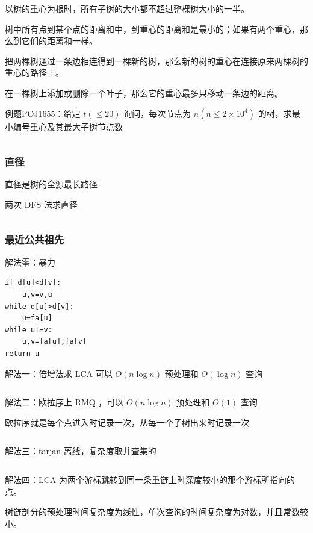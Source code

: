 \documentclass[twocolumn,10pt]{ctexart}
\begin{document}
以树的重心为根时，所有子树的大小都不超过整棵树大小的一半。

树中所有点到某个点的距离和中，到重心的距离和是最小的；如果有两个重心，那么到它们的距离和一样。

把两棵树通过一条边相连得到一棵新的树，那么新的树的重心在连接原来两棵树的重心的路径上。

在一棵树上添加或删除一个叶子，那么它的重心最多只移动一条边的距离。

\begin{notebox}
例题POJ1655：给定 $t(\le 20)$ 询问，每次节点为 $n(n\le2\times10^4)$ 的树，求最小编号重心及其最大子树节点数
\end{notebox}

\inputminted{cpp}{code/poj1655_tree_barycenter.cpp}

\subsubsection{直径}

直径是树的全源最长路径

两次 DFS 法求直径

\inputminted{cpp}{code/ext_028.cpp}

\subsubsection{最近公共祖先}

解法零：暴力

\begin{verbatim}
if d[u]<d[v]:
    u,v=v,u
while d[u]>d[v]:
    u=fa[u]
while u!=v:
    u,v=fa[u],fa[v]
return u
\end{verbatim}

解法一：倍增法求 LCA 可以 $O(n\log n)$ 预处理和 $O(\log n)$ 查询

\inputminted{cpp}{code/ext_029.cpp}

解法二：欧拉序上 RMQ ，可以 $O(n\log n)$ 预处理和 $O(1)$ 查询

欧拉序就是每个点进入时记录一次，从每一个子树出来时记录一次

\inputminted{cpp}{code/p3379_lca2.cpp}

解法三：tarjan 离线，复杂度取并查集的

\inputminted{cpp}{code/lca_tarjan.cpp}

解法四：LCA 为两个游标跳转到同一条重链上时深度较小的那个游标所指向的点。

树链剖分的预处理时间复杂度为线性，单次查询的时间复杂度为对数，并且常数较小。
\end{document}
